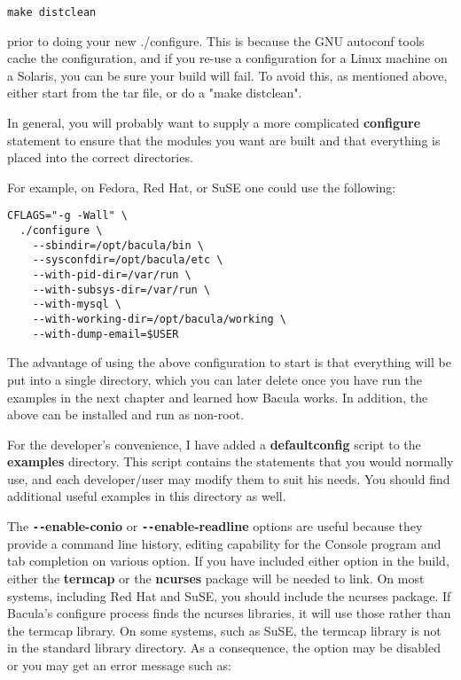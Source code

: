 \footnotesize
\begin{verbatim}
make distclean
\end{verbatim}
\normalsize

prior to doing your new ./configure. This is because the GNU autoconf tools
cache the configuration, and if you re-use a configuration for a Linux machine
on a Solaris, you can be sure your build will fail. To avoid this, as
mentioned above, either start from the tar file, or do a "make distclean". 

In general, you will probably want to supply a more complicated {\bf
configure} statement to ensure that the modules you want are built and that
everything is placed into the correct directories. 

For example, on Fedora, Red Hat, or SuSE one could use the following: 

\footnotesize
\begin{verbatim}
CFLAGS="-g -Wall" \
  ./configure \
    --sbindir=/opt/bacula/bin \
    --sysconfdir=/opt/bacula/etc \
    --with-pid-dir=/var/run \
    --with-subsys-dir=/var/run \
    --with-mysql \
    --with-working-dir=/opt/bacula/working \
    --with-dump-email=$USER
\end{verbatim}
\normalsize

The advantage of using the above configuration to start is that
everything will be put into a single directory, which you can later delete
once you have run the examples in the next chapter and learned how Bacula
works. In addition, the above can be installed and run as non-root. 

For the developer's convenience, I have added a {\bf defaultconfig} script to
the {\bf examples} directory. This script contains the statements that you
would normally use, and each developer/user may modify them to suit his needs.
You should find additional useful examples in this directory as well. 

The {\bf \verb:--:enable-conio} or {\bf \verb:--:enable-readline} options are
useful because they provide a command line history, editing capability for the
Console program and tab completion on various option. If you have included
either option in the build, either the {\bf termcap} or the {\bf ncurses}
package will be needed to link. On most systems, including Red Hat and SuSE,
you should include the ncurses package.  If Bacula's configure process finds
the ncurses libraries, it will use those rather than the termcap library.  On
some systems, such as SuSE, the termcap library is not in the standard library
directory.  As a consequence, the option may be disabled or you may get an
error message such as:

